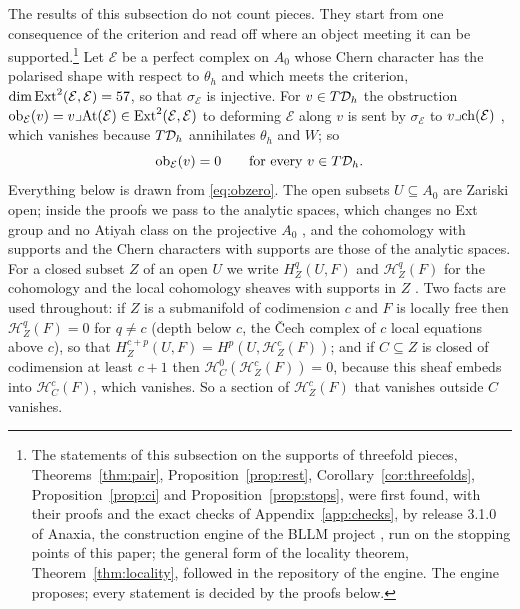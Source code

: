 The results of this subsection do not count pieces. They start from one consequence of the criterion and read off where an object meeting it can be supported.\footnote{The statements of this subsection on the supports of threefold pieces, Theorems~\ref{thm:pair}, Proposition~\ref{prop:rest}, Corollary~\ref{cor:threefolds}, Proposition~\ref{prop:ci} and Proposition~\ref{prop:stops}, were first found, with their proofs and the exact checks of Appendix~\ref{app:checks}, by release 3.1.0 of Anaxia, the construction engine of the BLLM project \cite{Bha26bllmb}, run on the stopping points of this paper; the general form of the locality theorem, Theorem~\ref{thm:locality}, followed in the repository of the engine. The engine proposes; every statement is decided by the proofs below.} Let $\mathcal{E}$ be a perfect complex on $A_{0}$ whose Chern character has the polarised shape with respect to $\theta_{h}$ and which meets the criterion, $\dim\mathrm{Ext}^{2}(\mathcal{E},\mathcal{E})=57$, so that $\sigma_{\mathcal{E}}$ is injective. For $v\in T\mathcal{D}_{h}$ the obstruction $\mathrm{ob}_{\mathcal{E}}(v)=v\lrcorner\mathrm{At}(\mathcal{E})\in\mathrm{Ext}^{2}(\mathcal{E},\mathcal{E})$ to deforming $\mathcal{E}$ along $v$ is sent by $\sigma_{\mathcal{E}}$ to $v\lrcorner\mathrm{ch}(\mathcal{E})$ \cite{BF03}, which vanishes because $T\mathcal{D}_{h}$ annihilates $\theta_{h}$ and $W$; so
\begin{equation}\label{eq:obzero}
\mathrm{ob}_{\mathcal{E}}(v)=0\qquad\text{for every }v\in T\mathcal{D}_{h}.
\end{equation}
Everything below is drawn from \eqref{eq:obzero}. The open subsets $U\subseteq A_{0}$ are Zariski open; inside the proofs we pass to the analytic spaces, which changes no Ext group and no Atiyah class on the projective $A_{0}$ \cite{Ser56}, and the cohomology with supports and the Chern characters with supports are those of the analytic spaces. For a closed subset $Z$ of an open $U$ we write $H^{q}_{Z}(U,F)$ and $\mathcal{H}^{q}_{Z}(F)$ for the cohomology and the local cohomology sheaves with supports in $Z$ \cite{Har67}. Two facts are used throughout: if $Z$ is a submanifold of codimension $c$ and $F$ is locally free then $\mathcal{H}^{q}_{Z}(F)=0$ for $q\ne c$ (depth below $c$, the \v{C}ech complex of $c$ local equations above $c$), so that $H^{c+p}_{Z}(U,F)=H^{p}(U,\mathcal{H}^{c}_{Z}(F))$; and if $C\subseteq Z$ is closed of codimension at least $c+1$ then $\mathcal{H}^{0}_{C}(\mathcal{H}^{c}_{Z}(F))=0$, because this sheaf embeds into $\mathcal{H}^{c}_{C}(F)$, which vanishes. So a section of $\mathcal{H}^{c}_{Z}(F)$ that vanishes outside $C$ vanishes.

